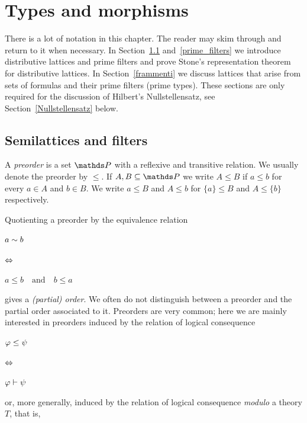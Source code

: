 \chapter{Types and morphisms}
\label{types}

\def\ceq#1#2#3{\parbox[b]{20ex}{$\displaystyle #1$}\parbox[b]{6ex}{\hfil$#2$}$\displaystyle #3$}

There is a lot of notation in this chapter.
The reader may skim through and return to it when necessary.
In Section~\ref{reticoli} and~\ref{prime_filters} we introduce distributive lattices and prime filters and prove Stone's representation theorem for distributive lattices.
In Section~\ref{frammenti} we discuss lattices that arise from sets of formulas and their prime filters (prime types).
These sections are only required for the discussion of Hilbert's Nullstellensatz, see Section~\ref{Nullstellensatz} below.

\section{Semilattices and filters}\label{reticoli}

A \emph{preorder\/} is a set $\PP$ with a reflexive and transitive relation.
We usually denote the preorder by $\le$.
If $A,B\subseteq\PP$ we write $A\le B$ if $a\le b$ for every $a\in A$ and $b\in B$.
We write $a\le B$ and $A\le b$ for $\{a\}\le B$ and  $A\le \{b\}$ respectively.

Quotienting a preorder by the equivalence relation

\ceq{\hfill a\sim b}{\IFF}{a\le b\quad\textrm{and}\quad b\le a}

gives a \emph{(partial) order}.
We often do not distinguish between a preorder and the partial order associated to it.
Preorders are very common; here we are mainly interested in preorders induced by the relation of logical consequence

\ceq{\hfill \phi\le\psi}{\IFF}{\phi\proves\psi}

or, more generally, induced by the relation of logical consequence \emph{modulo\/} a theory $T$, that is,

